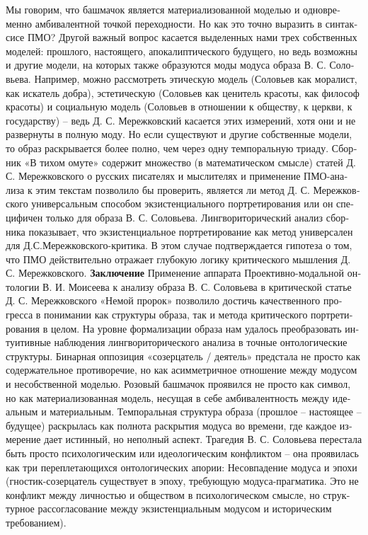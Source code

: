 \begin{russian}
    Мы говорим, что башмачок является материализованной моделью и одновременно амбивалентной точкой переходности. Но как это точно выразить в синтаксисе ПМО?
    Другой важный вопрос касается выделенных нами трех собственных моделей: прошлого, настоящего, апокалиптического будущего, но ведь возможны и другие модели, на которых также образуются моды модуса образа В. С. Соловьева. 
    Например, можно рассмотреть этическую модель (Соловьев как моралист, как искатель добра), эстетическую (Соловьев как ценитель красоты, как философ красоты) и социальную модель (Соловьев в отношении к обществу, к церкви, к государству) – ведь Д. С. Мережковский касается этих измерений, хотя они и не развернуты в полную моду. Но если существуют и другие собственные модели, то образ раскрывается более полно, чем через одну темпоральную триаду. 
    Сборник «В тихом омуте» содержит множество (в математическом смысле) статей Д. С. Мережковского о русских писателях и мыслителях и применение ПМО-анализа к этим текстам позволило бы проверить, является ли метод Д. С. Мережковского универсальным способом экзистенциального портретирования или он специфичен только для образа В. С. Соловьева. Лингвориторический анализ сборника показывает, что экзистенциальное портретирование как метод универсален для Д.С.Мережковского-критика. В этом случае подтверждается гипотеза о том, что ПМО действительно отражает глубокую логику критического мышления Д. С. Мережковского. 
    \textbf{Заключение}
    Применение аппарата Проективно-модальной онтологии В. И. Моисеева к анализу образа В. С. Соловьева в критической статье Д. С. Мережковского «Немой пророк» позволило достичь качественного прогресса в понимании как структуры образа, так и метода критического портретирования в целом.
    На уровне формализации образа нам удалось преобразовать интуитивные наблюдения лингвориторического анализа в точные онтологические структуры. Бинарная оппозиция «созерцатель / деятель» предстала не просто как содержательное противоречие, но как асимметричное отношение между модусом и несобственной моделью. Розовый башмачок проявился не просто как символ, но как материализованная модель, несущая в себе амбивалентность между идеальным и материальным. Темпоральная структура образа (прошлое – настоящее – будущее) раскрылась как полнота раскрытия модуса во времени, где каждое измерение дает истинный, но неполный аспект. Трагедия В. С. Соловьева перестала быть просто психологическим или идеологическим конфликтом – она проявилась как три переплетающихся онтологических апории:
    Несовпадение модуса и эпохи (гностик-созерцатель существует в эпоху, требующую модуса-прагматика. Это не конфликт между личностью и обществом в психологическом смысле, но структурное рассогласование между экзистенциальным модусом и историческим требованием).

\end{russian}
